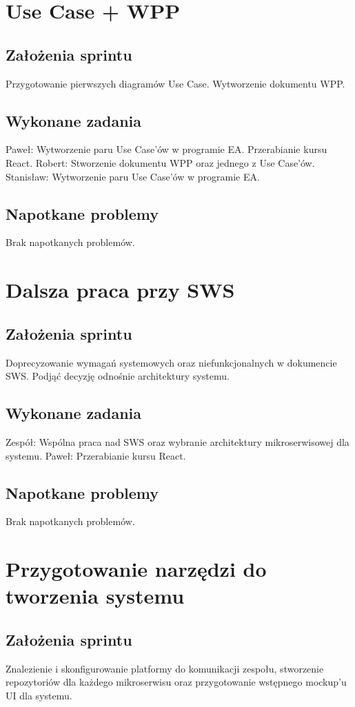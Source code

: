 \documentclass[a4paper,11pt]{report}
\begin{document}
\section {Use Case + WPP}
\subsection {Założenia sprintu}
Przygotowanie pierwszych diagramów Use Case. Wytworzenie dokumentu WPP.
\subsection {Wykonane zadania}
Paweł: Wytworzenie paru Use Case'ów w programie EA. Przerabianie kursu React.
Robert: Stworzenie dokumentu WPP oraz jednego z Use Case'ów.
Stanisław: Wytworzenie paru Use Case'ów w programie EA.
\subsection {Napotkane problemy}
Brak napotkanych problemów.

\section {Dalsza praca przy SWS}
\subsection {Założenia sprintu}
Doprecyzowanie wymagań systemowych oraz niefunkcjonalnych w dokumencie SWS. Podjąć decyzję odnośnie architektury systemu.
\subsection {Wykonane zadania}
Zespół: Wspólna praca nad SWS oraz wybranie architektury mikroserwisowej dla systemu.
Paweł: Przerabianie kursu React.
\subsection {Napotkane problemy}
Brak napotkanych problemów.

\section {Przygotowanie narzędzi do tworzenia systemu}
\subsection {Założenia sprintu}
Znalezienie i skonfigurowanie platformy do komunikacji zespołu, stworzenie repozytoriów dla każdego mikroserwisu oraz przygotowanie wstępnego mockup'u UI dla systemu.
\end{document}

